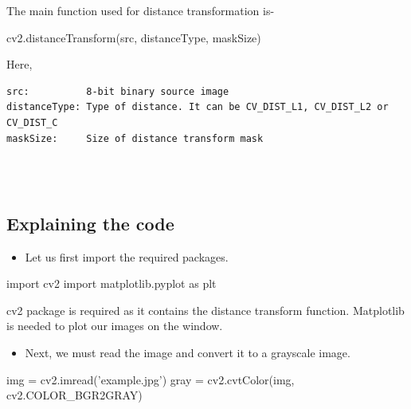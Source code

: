 \documentclass[]{article}
\newenvironment{Shaded}{}{}
\newcommand{\StringTok}[1]{\textcolor[rgb]{0.25,0.44,0.63}{{#1}}}
\newcommand{\ImportTok}[1]{{#1}}
\newcommand{\OperatorTok}[1]{\textcolor[rgb]{0.40,0.40,0.40}{{#1}}}
\newcommand{\NormalTok}[1]{{#1}}
\providecommand{\tightlist}{%
  \setlength{\itemsep}{0pt}\setlength{\parskip}{0pt}}
\begin{document}
The main function used for distance transformation is-

\begin{Shaded}
\begin{Highlighting}[]
\NormalTok{cv2.distanceTransform(src, distanceType, maskSize)}
\end{Highlighting}
\end{Shaded}

Here,

\begin{verbatim}
src:          8-bit binary source image
distanceType: Type of distance. It can be CV_DIST_L1, CV_DIST_L2 or CV_DIST_C
maskSize:     Size of distance transform mask
\end{verbatim}
~\\ \\
\subsection{Explaining the code}\label{explaining-the-code}

\begin{itemize}
\tightlist
\item
  Let us first import the required packages.
\end{itemize}

\begin{Shaded}
\begin{Highlighting}[]
    \ImportTok{import} \NormalTok{cv2}
    \ImportTok{import} \NormalTok{matplotlib.pyplot }\ImportTok{as} \NormalTok{plt}
\end{Highlighting}
\end{Shaded}

cv2 package is required as it contains the distance transform function.
Matplotlib is needed to plot our images on the window.

\begin{itemize}
\tightlist
\item
  Next, we must read the image and convert it to a grayscale image.
\end{itemize}

\begin{Shaded}
\begin{Highlighting}[]
    \NormalTok{img }\OperatorTok{=} \NormalTok{cv2.imread(}\StringTok{'example.jpg'}\NormalTok{)}
    \NormalTok{gray }\OperatorTok{=} \NormalTok{cv2.cvtColor(img, cv2.COLOR_BGR2GRAY)}
\end{Highlighting}
\end{Shaded}
\end{document}
